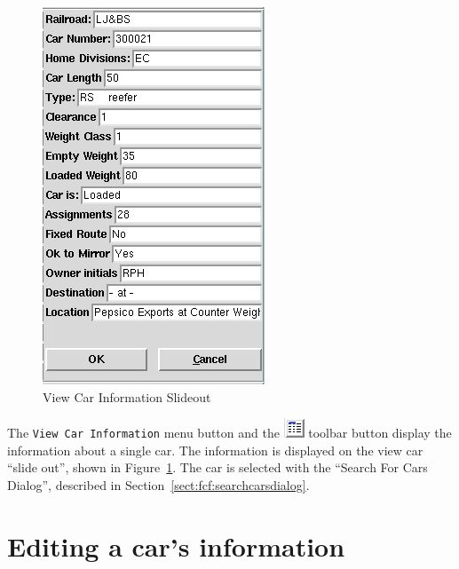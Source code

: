 \begin{figure}[hbpt]
\begin{centering}
\includegraphics{FCFViewCarSlideout.png}
\caption{View Car Information Slideout}
\label{fig:fcf:viewcarslideout}
\end{centering}
\end{figure}
The \verb=View Car Information= menu button and the
\includegraphics{FCFViewCarTool.png} toolbar button display the
information about a single car.  The information is displayed on the
view car ``slide out'', shown in Figure~\ref{fig:fcf:viewcarslideout}.
The car is selected with the ``Search For Cars Dialog'', described in
Section~\ref{sect:fcf:searchcarsdialog}. 

\section{Editing a car's information}

